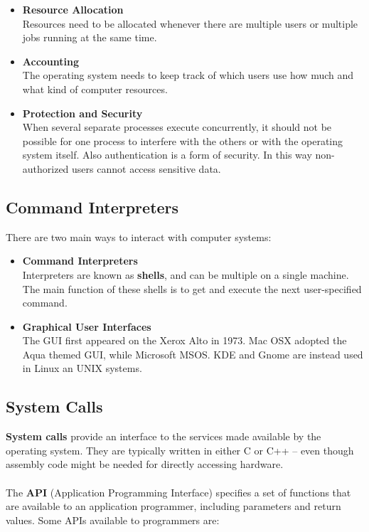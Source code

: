 \documentclass{article}
\begin{document}
\begin{itemize}
	\item \textbf{Resource Allocation}
	\vspace{.2cm} \\
	Resources need to be allocated whenever there are multiple users or multiple jobs running at the same time.
	
	\item \textbf{Accounting}
	\vspace{.2cm} \\
	The operating system needs to keep track of which users use how much and what kind of computer resources.
	
	\item \textbf{Protection and Security}
	\vspace{.2cm} \\
	When several separate processes execute concurrently, it should not be possible for one process to interfere with the others or with the operating system itself. Also authentication is a form of security. In this way non-authorized users cannot access sensitive data.
\end{itemize}

\subsection{Command Interpreters}
There are two main ways to interact with computer systems:

\begin{itemize}
	\item \textbf{Command Interpreters}
	\vspace{.2cm} \\
	Interpreters are known as \textbf{shells}, and can be multiple on a single machine. The main function of these shells is to get and execute the next user-specified command.
	
	\item \textbf{Graphical User Interfaces}
	\vspace{.2cm} \\
	The GUI first appeared on the Xerox Alto in 1973. Mac OSX adopted the Aqua themed GUI, while Microsoft MSOS. KDE and Gnome are instead used in Linux an UNIX systems.
\end{itemize}

\subsection{System Calls}
\textbf{System calls} provide an interface to the services made available by the operating system. They are typically written in either C or C++ -- even though assembly code might be needed for directly accessing hardware. \\ \\
The \textbf{API} (Application Programming Interface) specifies a set of functions that are available to an application programmer, including parameters and return values. Some APIs available to programmers are:
\end{document}
